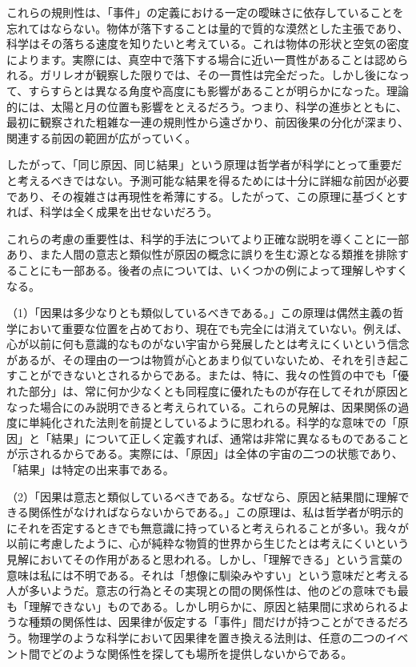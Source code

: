 \documentclass[a4paper,11pt,openany]{ltjsbook}
\begin{document}
これらの規則性は、「事件」の定義における一定の曖昧さに依存していることを忘れてはならない。物体が落下することは量的で質的な漠然とした主張であり、科学はその落ちる速度を知りたいと考えている。これは物体の形状と空気の密度によります。実際には、真空中で落下する場合に近い一貫性があることは認められる。ガリレオが観察した限りでは、その一貫性は完全だった。しかし後になって、すらすらとは異なる角度や高度にも影響があることが明らかになった。理論的には、太陽と月の位置も影響をとえるだろう。つまり、科学の進歩とともに、最初に観察された粗雑な一連の規則性から遠ざかり、前因後果の分化が深まり、関連する前因の範囲が広がっていく。

したがって、「同じ原因、同じ結果」という原理は哲学者が科学にとって重要だと考えるべきではない。予測可能な結果を得るためには十分に詳細な前因が必要であり、その複雑さは再現性を希薄にする。したがって、この原理に基づくとすれば、科学は全く成果を出せないだろう。

これらの考慮の重要性は、科学的手法についてより正確な説明を導くことに一部あり、また人間の意志と類似性が原因の概念に誤りを生む源となる類推を排除することにも一部ある。後者の点については、いくつかの例によって理解しやすくなる。

（1）「因果は多少なりとも類似しているべきである。」この原理は偶然主義の哲学において重要な位置を占めており、現在でも完全には消えていない。例えば、心が以前に何も意識的なものがない宇宙から発展したとは考えにくいという信念があるが、その理由の一つは物質が心とあまり似ていないため、それを引き起こすことができないとされるからである。または、特に、我々の性質の中でも「優れた部分」は、常に何か少なくとも同程度に優れたものが存在してそれが原因となった場合にのみ説明できると考えられている。これらの見解は、因果関係の過度に単純化された法則を前提としているように思われる。科学的な意味での「原因」と「結果」について正しく定義すれば、通常は非常に異なるものであることが示されるからである。実際には、「原因」は全体の宇宙の二つの状態であり、「結果」は特定の出来事である。

（2）「因果は意志と類似しているべきである。なぜなら、原因と結果間に理解できる関係性がなければならないからである。」この原理は、私は哲学者が明示的にそれを否定するときでも無意識に持っていると考えられることが多い。我々が以前に考慮したように、心が純粋な物質的世界から生じたとは考えにくいという見解においてその作用があると思われる。しかし、「理解できる」という言葉の意味は私には不明である。それは「想像に馴染みやすい」という意味だと考える人が多いようだ。意志の行為とその実現との間の関係性は、他のどの意味でも最も「理解できない」ものである。しかし明らかに、原因と結果間に求められるような種類の関係性は、因果律が仮定する「事件」間だけが持つことができるだろう。物理学のような科学において因果律を置き換える法則は、任意の二つのイベント間でどのような関係性を探しても場所を提供しないからである。
\end{document}
